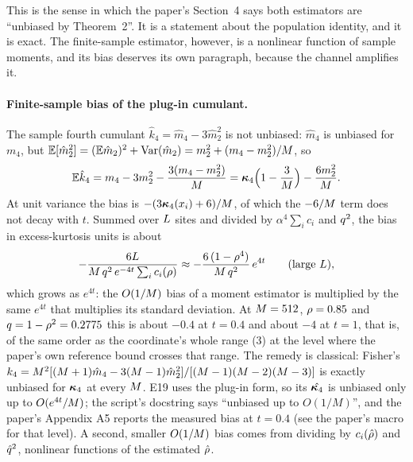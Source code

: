This is the sense in which the paper's Section~4 says both estimators are ``unbiased by
Theorem~2''. It is a statement about the population identity, and it is exact. The
finite-sample estimator, however, is a nonlinear function of sample moments, and its
bias deserves its own paragraph, because the channel amplifies it.

\paragraph{Finite-sample bias of the plug-in cumulant.}
The sample fourth cumulant $\hat k_4=\hat m_4-3\hat m_2^2$ is not unbiased: $\hat m_4$
is unbiased for $m_4$, but $\mathbb{E}[\hat m_2^2]=(\mathbb{E}\hat m_2)^2+\operatorname{Var}(\hat m_2)=m_2^2+(m_4-m_2^2)/M$,
so
\begin{equation}
  \mathbb{E}\hat k_4=m_4-3m_2^2-\frac{3(m_4-m_2^2)}{M}
  =\bm{\kappa}_4\Bigl(1-\frac3{M}\Bigr)-\frac{6m_2^2}{M}.
  \label{eq:k4-bias}
\end{equation}
At unit variance the bias is $-(3\bm{\kappa}_4(x_i)+6)/M$, of which the $-6/M$ term does
not decay with $t$. Summed over $L$ sites and divided by $\alpha^4\sum_ic_i$ and
$q^2$, the bias in excess-kurtosis units is about
\begin{equation}
  -\frac{6L}{M\,q^2\,e^{-4t}\sum_ic_i(\rho)}
  \approx-\frac{6\,(1-\rho^4)}{M\,q^2}\,e^{4t}
  \qquad(\text{large }L),
  \label{eq:k4-bias-amplified}
\end{equation}
which grows as $e^{4t}$: the $O(1/M)$ bias of a moment estimator is multiplied by
the same $e^{4t}$ that multiplies its standard deviation. At $M=512$, $\rho=0.85$
and $q=1-\rho^2=0.2775$ this is about $-0.4$ at $t=0.4$ and about $-4$ at $t=1$,
that is, of the same order as the coordinate's whole range ($3$) at the level where the
paper's own reference bound crosses that range. The remedy is classical: Fisher's
 $k_4=M^2[(M+1)\hat m_4-3(M-1)\hat m_2^2]/[(M-1)(M-2)(M-3)]$
is exactly unbiased for $\bm{\kappa}_4$ at every $M$. E19 uses the plug-in form, so its
$\hat{\bm{\kappa}_4}$ is unbiased only up to $O(e^{4t}/M)$; the script's docstring says
``unbiased up to $O(1/M)$'', and the paper's Appendix A5 reports the measured bias at
$t=0.4$ (see the paper's macro for that level). A second, smaller $O(1/M)$ bias
comes from dividing by $c_i(\hat{\rho})$ and $\hat{q}^2$, nonlinear functions of the
estimated $\hat{\rho}$.

